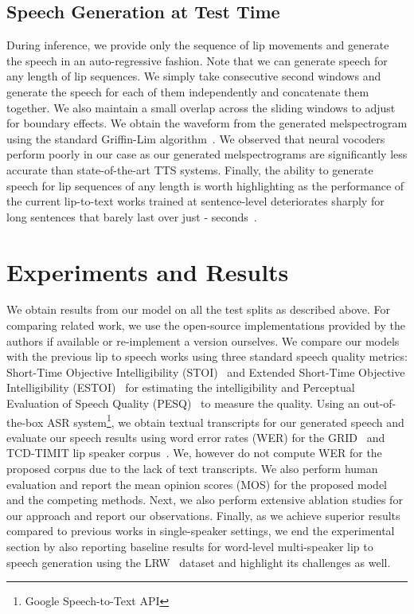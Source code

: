 \documentclass[10pt,twocolumn,letterpaper]{article}
\begin{document}
\subsection{Speech Generation at Test Time}
During inference, we provide only the sequence of lip movements and generate the speech in an auto-regressive fashion. Note that we can generate speech for any length of lip sequences. We simply take consecutive  second windows and generate the speech for each of them independently and concatenate them together. We also maintain a small overlap across the sliding windows to adjust for boundary effects. We obtain the waveform from the generated melspectrogram using the standard Griffin-Lim algorithm~\cite{Griffin1983SignalEF}. We observed that neural vocoders~\cite{Oord2016WaveNetAG} perform poorly in our case as our generated melspectrograms are significantly less accurate than state-of-the-art TTS systems. Finally, the ability to generate speech for lip sequences of any length is worth highlighting as the performance of the current lip-to-text works trained at sentence-level deteriorates sharply for long sentences that barely last over just  -  seconds~\cite{Afouras2018DeepLR}. 

\section{Experiments and Results}
\label{section:experiments}
We obtain results from our \modelname model on all the test splits as described above. For comparing related work, we use the open-source implementations provided by the authors if available or re-implement a version ourselves. We compare our models with the previous lip to speech works using three standard speech quality metrics: Short-Time Objective Intelligibility (STOI)~\cite{stoi} and Extended Short-Time Objective Intelligibility (ESTOI)~\cite{estoi} for estimating the intelligibility and Perceptual Evaluation of Speech Quality (PESQ)~\cite{pesq} to measure the quality. Using an out-of-the-box ASR system\footnote{Google Speech-to-Text API}, we obtain textual transcripts for our generated speech and evaluate our speech results using word error rates (WER) for the GRID~\cite{cooke2006audio} and TCD-TIMIT lip speaker corpus~\cite{harte2015tcd}. We, however do not compute WER for the proposed \modelname corpus due to the lack of text transcripts. We also perform human evaluation and report the mean opinion scores (MOS) for the proposed \modelname model and the competing methods. Next, we also perform extensive ablation studies for our approach and report our observations. Finally, as we achieve superior results compared to previous works in single-speaker settings, we end the experimental section by also reporting baseline results for word-level multi-speaker lip to speech generation using the LRW~\cite{chung2016lip} dataset and highlight its challenges as well.
\end{document}
